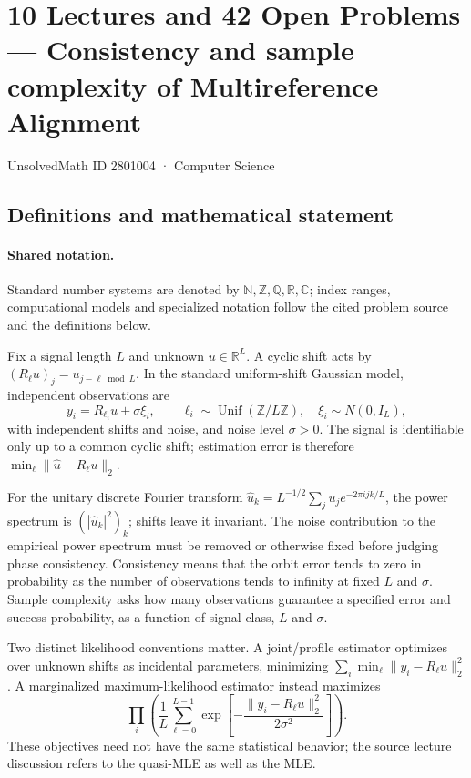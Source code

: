 \documentclass[11pt]{article}
\begin{document}
\setcounter{section}{2801003}
\section{10 Lectures and 42 Open Problems — Consistency and sample complexity of Multireference Alignment}\label{2801004}
{\small\sffamily UnsolvedMath ID 2801004 · Computer Science}
\subsection{Definitions and mathematical statement}

\paragraph{Shared notation.}Standard number systems are denoted by $\mathbb N,\mathbb Z,\mathbb Q,\mathbb R,\mathbb C$; index ranges, computational models and specialized notation follow the cited problem source and the definitions below.


Fix a signal length $L$ and unknown $u\in\mathbb{R}^L$. A cyclic shift acts by $(R_\ell u)_j=u_{j-\ell\bmod L}$. In the standard uniform-shift Gaussian model, independent observations are
\[
 y_i=R_{\ell_i}u+\sigma\xi_i,\qquad
 \ell_i\sim\operatorname{Unif}(\mathbb{Z}/L\mathbb{Z}),\quad
 \xi_i\sim N(0,I_L),
\]
with independent shifts and noise, and noise level $\sigma>0$. The signal is identifiable only up to a common cyclic shift; estimation error is therefore $\min_\ell\|\widehat u-R_\ell u\|_2$.

For the unitary discrete Fourier transform $\widehat u_k=L^{-1/2}\sum_j u_j e^{-2\pi i jk/L}$, the power spectrum is $(|\widehat u_k|^2)_k$; shifts leave it invariant. The noise contribution to the empirical power spectrum must be removed or otherwise fixed before judging phase consistency. Consistency means that the orbit error tends to zero in probability as the number of observations tends to infinity at fixed $L$ and $\sigma$. Sample complexity asks how many observations guarantee a specified error and success probability, as a function of signal class, $L$ and $\sigma$.

Two distinct likelihood conventions matter. A joint/profile estimator optimizes over unknown shifts as incidental parameters, minimizing $\sum_i\min_\ell\|y_i-R_\ell u\|_2^2$. A marginalized maximum-likelihood estimator instead maximizes
\[
 \prod_i\left(\frac1L\sum_{\ell=0}^{L-1}
 \exp\left[-\frac{\|y_i-R_\ell u\|_2^2}{2\sigma^2}\right]\right).
\]
These objectives need not have the same statistical behavior; the source lecture discussion refers to the quasi-MLE as well as the MLE.
\end{document}
